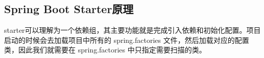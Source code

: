 \documentclass[../../../interview-questions.tex]{subfiles}
\begin{document}
\subsection{Spring Boot Starter原理}

starter可以理解为一个依赖组，其主要功能就是完成引入依赖和初始化配置。项目启动的时候会去加载项目中所有的 spring.factories 文件，然后加载对应的配置类，因此我们就需要在 spring.factories 中只指定需要扫描的类。
\end{document}
